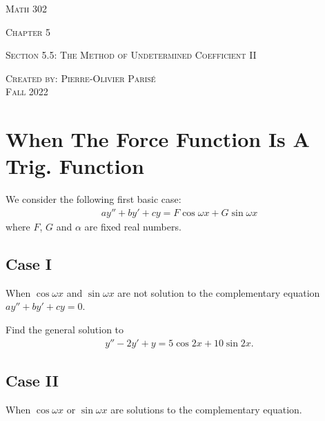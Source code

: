 \documentclass[12pt,a4paper]{article}
\newcounter{example}[section]
\begin{document}
\thispagestyle{empty}

\begin{center}
\vspace*{2.5cm}

{\Huge \textsc{Math 302}}

\vspace*{2cm}

{\LARGE \textsc{Chapter 5}} 

\vspace*{0.75cm}

\noindent\textsc{Section 5.5: The Method of Undetermined Coefficient II}

\vspace*{0.75cm}

\tableofcontents

\vfill

\noindent \textsc{Created by: Pierre-Olivier Paris{\'e}} \\
\textsc{Fall 2022}
\end{center}

\newpage

\section{When The Force Function Is A Trig. Function}

We consider the following first basic case:
	\begin{align*}
	ay'' + by' + cy = F \cos \omega x + G \sin \omega x 
	\end{align*}
where $F$, $G$ and $\alpha$ are fixed real numbers.
	
\subsection{Case I}
When $\cos \omega x$ and $\sin \omega x$ are not solution to the complementary equation $ay'' + by' + cy = 0$.

\begin{example}
Find the general solution to
	\begin{align*}
	y'' - 2y' + y = 5\cos 2x + 10 \sin 2x .
	\end{align*}
\end{example}

\newpage

\phantom{1}

\newpage

\subsection{Case II}
When $\cos \omega x$ or $\sin \omega x$ are solutions to the complementary equation.
\end{document}
